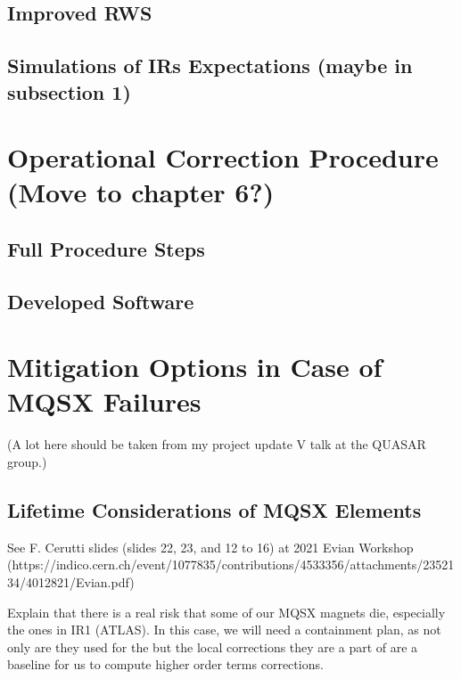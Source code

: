 \subsection{Improved RWS}

\subsection{Simulations of IRs Expectations (maybe in subsection 1)}


\section{Operational Correction Procedure (Move to chapter 6?)}

\subsection{Full Procedure Steps}

\subsection{Developed Software}


\section{Mitigation Options in Case of MQSX Failures}

(A lot here should be taken from my project update V talk at the QUASAR group.)

\subsection{Lifetime Considerations of MQSX Elements}

See F. Cerutti slides (slides 22, 23, and 12 to 16) at 2021 Evian Workshop
(https://indico.cern.ch/event/1077835/contributions/4533356/attachments/2352134/4012821/Evian.pdf)

Explain that there is a real risk that some of our MQSX magnets die, especially the ones in IR1 (ATLAS).
In this case, we will need a containment plan, as not only are they used for the but the local corrections they are a part of are a baseline for us to compute higher order terms corrections.


